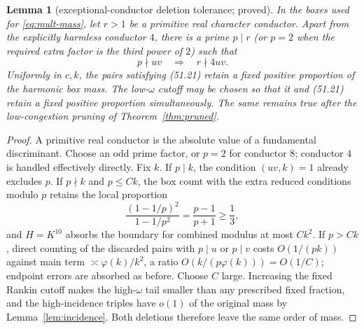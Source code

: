 \documentclass[10pt,reqno]{amsart}
\newtheorem{lemma}[theorem]{Lemma}
\theoremstyle{definition}
\newcommand{\1}{\mathbf 1}
\begin{document}
\begin{lemma}[exceptional-conductor deletion tolerance; proved]
\label{lem:conductor-deletion}
In the boxes used for \eqref{eq:mult-mass}, let $r>1$ be a primitive real
character conductor.  Apart from the explicitly harmless conductor $4$,
there is a prime $p\mid r$ (or $p=2$ when the required extra factor is the
third power of $2$) such that
\begin{equation}\tag{51.21}
                  p\nmid uv\quad\Longrightarrow\quad r\nmid4uv.
\end{equation}
Uniformly in $c,k$, the pairs satisfying (51.21) retain a fixed positive
proportion of the harmonic box mass.  The low-$\omega$ cutoff may be chosen
so that it and (51.21) retain a fixed positive proportion simultaneously.
The same remains true after the low-congestion pruning of
Theorem~\ref{thm:pruned}.
\end{lemma}
\begin{proof}
A primitive real conductor is the absolute value of a fundamental
discriminant.  Choose an odd prime factor, or $p=2$ for conductor $8$;
conductor $4$ is handled effectively directly.  Fix $k$.  If $p\mid k$,
the condition $(uv,k)=1$ already excludes $p$.  If $p\nmid k$ and
$p\leq Ck$, the box count with the extra reduced conditions modulo $p$
retains the local proportion
\begin{equation}\tag{51.22}
 \frac{(1-1/p)^2}{1-1/p^2}=\frac{p-1}{p+1}\geq\frac13,
\end{equation}
and $H=K^{10}$ absorbs the boundary for combined modulus at most $Ck^2$.
If $p>Ck$, direct counting of the discarded pairs with $p\mid u$ or
$p\mid v$ costs $O(1/(pk))$ against main term
$\asymp\varphi(k)/k^2$, a ratio $O(k/(p\varphi(k)))=O(1/C)$; endpoint
errors are absorbed as before.  Choose $C$ large.  Increasing the fixed
Rankin cutoff makes the high-$\omega$ tail smaller than any prescribed
fixed fraction, and the high-incidence triples have $o(1)$ of the original
mass by Lemma~\ref{lem:incidence}.  Both deletions therefore leave the same
order of mass.
\end{proof}
\end{document}
